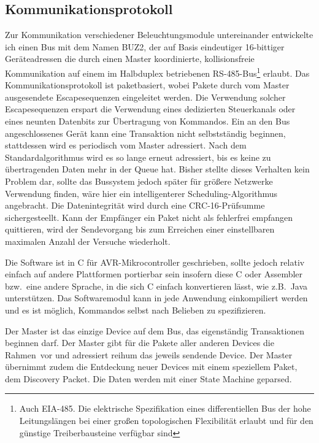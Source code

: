 \documentclass[12pt,a4paper,notitlepage]{article}
\begin{document}
\subsection{Kommunikationsprotokoll}
Zur Kommunikation verschiedener Beleuchtungsmodule untereinander entwickelte ich einen Bus mit dem Namen BUZ2, der auf Basis eindeutiger 16-bittiger Geräteadressen die durch einen Master koordinierte, kollisionsfreie Kommunikation auf einem im \gls{Halbduplex} betriebenen RS-485-Bus\footnote{Auch EIA-485. Die elektrische Spezifikation eines differentiellen Bus der hohe Leitungslängen bei einer großen topologischen Flexibilität erlaubt und für den günstige Treiberbausteine verfügbar sind}\cite{MAXIM76} erlaubt. Das Kommunikationsprotokoll ist paketbasiert, wobei Pakete durch vom Master ausgesendete Escapesequenzen eingeleitet werden. Die Verwendung solcher Escapesequenzen erspart die Verwendung eines dedizierten Steuerkanals oder eines neunten Datenbits zur Übertragung von Kommandos. Ein an den Bus angeschlossenes Gerät kann eine Transaktion nicht selbstständig beginnen, stattdessen wird es periodisch vom Master adressiert. Nach dem Standardalgorithmus wird es so lange erneut adressiert, bis es keine zu übertragenden Daten mehr in der Queue hat. Bisher stellte dieses Verhalten kein Problem dar, sollte das Bussystem jedoch später für größere Netzwerke Verwendung finden, wäre hier ein intelligenterer Scheduling-Algorithmus angebracht. Die Datenintegrität wird durch eine CRC-16-Prüfsumme sichergesteellt. Kann der Empfänger ein Paket nicht als fehlerfrei empfangen quittieren, wird der Sendevorgang bis zum Erreichen einer einstellbaren maximalen Anzahl der Versuche wiederholt.

Die Software ist in C für AVR-Mikrocontroller geschrieben, sollte jedoch relativ einfach auf andere Plattformen portierbar sein insofern diese C oder Assembler bzw.\ eine andere Sprache, in die sich C einfach konvertieren lässt, wie z.B.\ Java unterstützen. Das Softwaremodul kann in jede Anwendung einkompiliert werden und es ist möglich, Kommandos selbst nach Belieben zu spezifizieren.

Der Master ist das einzige Device auf dem Bus, das eigenständig Transaktionen beginnen darf. Der Master gibt für die Pakete aller anderen Devices die \glqq Rahmen\grqq\ vor und adressiert reihum das jeweils sendende Device. Der Master übernimmt zudem die Entdeckung neuer Devices mit einem speziellem Paket, dem \glqq Discovery Packet\grqq. Die Daten werden mit einer State Machine geparsed.
\end{document}
